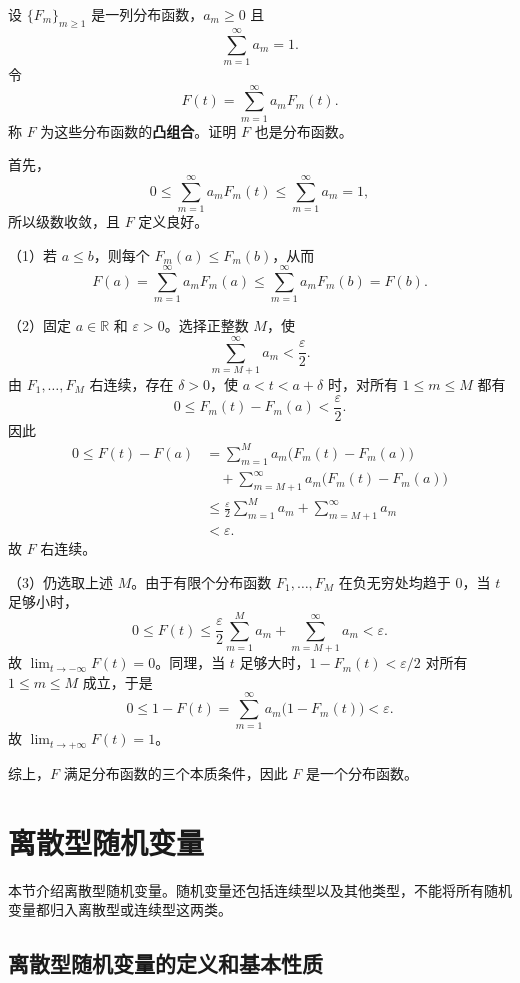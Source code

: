 \begin{example}[可列个分布函数的凸组合]
设 $\{F_m\}_{m\geq1}$ 是一列分布函数，$a_m\geq0$ 且
\[
\sum_{m=1}^{\infty}a_m=1.
\]
令
\[
F(t)=\sum_{m=1}^{\infty}a_mF_m(t).
\]
称 $F$ 为这些分布函数的\textbf{凸组合}。证明 $F$ 也是分布函数。

首先，
\[
0\leq\sum_{m=1}^{\infty}a_mF_m(t)
\leq\sum_{m=1}^{\infty}a_m=1,
\]
所以级数收敛，且 $F$ 定义良好。

（1）若 $a\leq b$，则每个 $F_m(a)\leq F_m(b)$，从而
\[
F(a)=\sum_{m=1}^{\infty}a_mF_m(a)
\leq\sum_{m=1}^{\infty}a_mF_m(b)=F(b).
\]

（2）固定 $a\in\mathbb R$ 和 $\varepsilon>0$。选择正整数 $M$，使
\[
\sum_{m=M+1}^{\infty}a_m<\frac{\varepsilon}{2}.
\]
由 $F_1,\ldots,F_M$ 右连续，存在 $\delta>0$，使 $a<t<a+\delta$ 时，对所有 $1\leq m\leq M$ 都有
\[
0\leq F_m(t)-F_m(a)<\frac{\varepsilon}{2}.
\]
因此
\[
\begin{aligned}
0\leq F(t)-F(a)
&=\sum_{m=1}^{M}a_m\bigl(F_m(t)-F_m(a)\bigr)\\
&\quad+\sum_{m=M+1}^{\infty}a_m\bigl(F_m(t)-F_m(a)\bigr)\\
&\leq\frac{\varepsilon}{2}\sum_{m=1}^{M}a_m
+\sum_{m=M+1}^{\infty}a_m\\
&<\varepsilon.
\end{aligned}
\]
故 $F$ 右连续。

（3）仍选取上述 $M$。由于有限个分布函数 $F_1,\ldots,F_M$ 在负无穷处均趋于 $0$，当 $t$ 足够小时，
\[
0\leq F(t)
\leq\frac{\varepsilon}{2}\sum_{m=1}^{M}a_m
+\sum_{m=M+1}^{\infty}a_m
<\varepsilon.
\]
故 $\lim_{t\to-\infty}F(t)=0$。同理，当 $t$ 足够大时，$1-F_m(t)<\varepsilon/2$ 对所有 $1\leq m\leq M$ 成立，于是
\[
0\leq1-F(t)
=\sum_{m=1}^{\infty}a_m\bigl(1-F_m(t)\bigr)
<\varepsilon.
\]
故 $\lim_{t\to+\infty}F(t)=1$。

综上，$F$ 满足分布函数的三个本质条件，因此 $F$ 是一个分布函数。
\end{example}

\section{离散型随机变量}
\label{sec:discrete-random-variables}

本节介绍离散型随机变量。随机变量还包括连续型以及其他类型，不能将所有随机变量都归入离散型或连续型这两类。

\subsection*{离散型随机变量的定义和基本性质}

